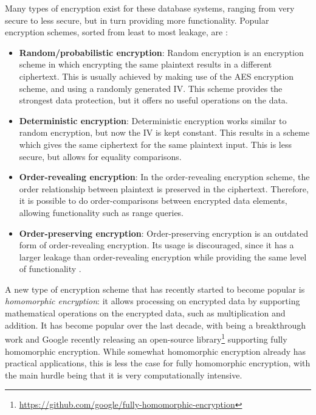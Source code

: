 Many types of encryption exist for these database systems, ranging from very secure to less secure, but in turn providing more functionality. Popular encryption schemes, sorted from least to most leakage, are \citep{cryptdice, datablinder}:
\begin{itemize}
    \item \textbf{Random/probabilistic encryption}: Random encryption is an encryption scheme in which encrypting the same plaintext results in a different ciphertext. This is usually achieved by making use of the AES encryption scheme, and using a randomly generated \gls{IV}. This scheme provides the strongest data protection, but it offers no useful operations on the data.
    \item \textbf{Deterministic encryption}: Deterministic encryption works similar to random encryption, but now the \gls{IV} is kept constant. This results in a scheme which gives the same ciphertext for the same plaintext input. This is less secure, but allows for equality comparisons.
    \item \textbf{Order-revealing encryption}: In the order-revealing encryption scheme, the order relationship between plaintext is preserved in the ciphertext. Therefore, it is possible to do order-comparisons between encrypted data elements, allowing functionality such as range queries.
    \item \textbf{Order-preserving encryption}: Order-preserving encryption is an outdated form of order-revealing encryption. Its usage is discouraged, since it has a larger leakage than order-revealing encryption while providing the same level of functionality \citep{stanford-ore}.
\end{itemize}
A new type of encryption scheme that has recently started to become popular is \textit{homomorphic encryption}: it allows processing on encrypted data by supporting mathematical operations on the encrypted data, such as multiplication and addition. It has become popular over the last decade, with \citet{fhe} being a breakthrough work and Google recently releasing an open-source library\footnote{\url{https://github.com/google/fully-homomorphic-encryption}} supporting fully homomorphic encryption. While somewhat homomorphic encryption already has practical applications, this is less the case for fully homomorphic encryption, with the main hurdle being that it is very computationally intensive.
